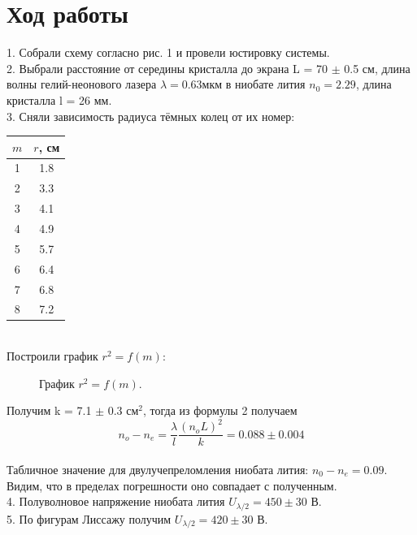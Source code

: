 \documentclass[a4paper,12pt]{article}
\begin{document}
\section{Ход работы}
1. Собрали схему согласно рис. 1 и провели юстировку системы.\\
2. Выбрали расстояние от середины кристалла до экрана L = 70 $\pm$ 0.5 см, длина волны гелий-неонового лазера $ \lambda = 0.63 мкм$ в ниобате лития $n_0 = 2.29$, длина кристалла l = 26 мм.  \\
3. Сняли зависимость радиуса тёмных колец от их номер: \\
\begin{table}[h]
\centering
\begin{tabular}{|c|c|}
\hline
$m$ & $r$, см  \\
\hline
1 & 1.8    \\
\hline
2 & 3.3    \\
\hline
3 & 4.1    \\
\hline
4 & 4.9    \\
\hline
5 & 5.7    \\
\hline
6 & 6.4    \\
\hline
7 & 6.8    \\
\hline
8 & 7.2    \\
\hline
\end{tabular}
\end{table}\\
Построили график $r^2 = f(m)$:
\begin{figure}[H]
 \caption{\centering График $r^2 = f(m)$.}
\end{figure}
Получим k = 7.1 $\pm$ 0.3 см$^2$, тогда из формулы 2 получаем\\
$$n_{o}-n_{e} = \dfrac{\lambda}{l} \dfrac{(n_oL)^2}{k} = 0.088 \pm 0.004$$ \\
Табличное значение для двулучепреломления ниобата лития: $n_0 - n_e = 0.09$. Видим, что в пределах погрешности оно совпадает с полученным.\\
4. Полуволновое напряжение ниобата лития  $U_{\lambda/2} = 450 \pm 30$ В.\\
5. По фигурам Лиссажу получим  $U_{\lambda/2} = 420 \pm 30$ В.\\
\end{document}
